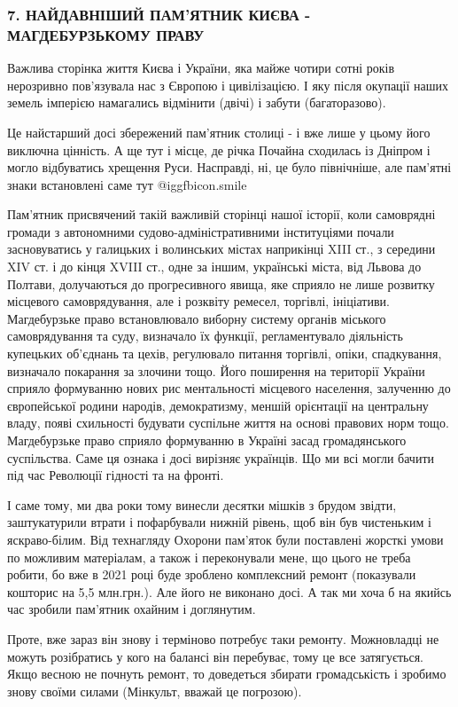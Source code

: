  
 
 
 
 

\subsubsection{7. НАЙДАВНІШИЙ ПАМ'ЯТНИК КИЄВА - МАГДЕБУРЗЬКОМУ ПРАВУ}

Важлива сторінка життя Києва і України, яка майже чотири сотні років нерозривно
пов’язувала нас з Європою і цивілізацією. І яку після окупації наших земель
імперією намагались відмінити (двічі) і забути (багаторазово). 

Це найстарший досі збережений пам’ятник столиці - і вже лише у цьому його
виключна цінність. А ще тут і місце, де річка Почайна сходилась із Дніпром і
могло відбуватись хрещення Руси. Насправді, ні, це було північніше, але
пам’ятні знаки встановлені саме тут  @igg{fbicon.smile}   

Пам’ятник присвячений такій важливій сторінці нашої історії, коли самоврядні
громади з автономними судово-адміністративними інституціями почали
засновуватись у галицьких і волинських містах наприкінці XIII ст., з середини
XIV ст. і до кінця XVIII ст., одне за іншим, українські міста, від Львова до
Полтави, долучаються до прогресивного явища, яке сприяло не лише розвитку
місцевого самоврядування, але і розквіту ремесел, торгівлі, ініціативи.
Магдебурзьке право встановлювало виборну систему органів міського
самоврядування та суду, визначало їх функції, регламентувало діяльність
купецьких об'єднань та цехів, регулювало питання торгівлі, опіки, спадкування,
визначало покарання за злочини тощо. Його поширення на території України
сприяло формуванню нових рис ментальності місцевого населення, залученню до
європейської родини народів, демократизму, меншій орієнтації на центральну
владу, появі схильності будувати суспільне життя на основі правових норм тощо.
Магдебурзьке право сприяло формуванню в Україні засад громадянського
суспільства. Саме ця ознака і досі вирізняє українців. Що ми всі могли бачити
під час Революції гідності та на фронті.

І саме тому, ми два роки тому винесли десятки мішків з брудом звідти,
заштукатурили втрати і пофарбували нижній рівень, щоб він був чистеньким і
яскраво-білим. Від технагляду Охорони пам'яток були поставлені жорсткі умови по
можливим матеріалам, а також і переконували мене, що цього не треба робити, бо
вже в 2021 році буде зроблено комплексний ремонт (показували кошторис на 5,5
млн.грн.). Але його не виконано досі. А так ми хоча б на якийсь час зробили
пам'ятник охайним і доглянутим. 

Проте, вже зараз він знову і терміново потребує таки ремонту. Можновладці не
можуть розібратись у кого на балансі він перебуває, тому це все затягується.
Якщо весною не почнуть ремонт, то доведеться збирати громадськість і зробимо
знову своїми силами (Мінкульт, вважай це погрозою). 
